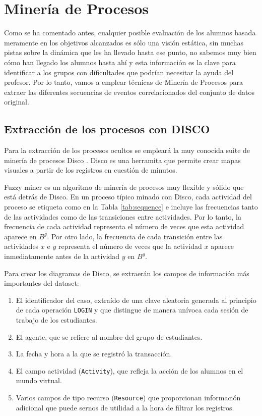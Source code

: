 \chapter{Minería de Procesos}

Como se ha comentado antes, cualquier posible evaluación de los alumnos basada meramente en los objetivos alcanzados es sólo una visión estática, sin muchas pistas sobre la dinámica que les ha llevado hasta ese punto, no sabemos muy bien cómo han llegado los alumnos hasta ahí y esta información es la clave para identificar a los grupos con dificultades que podrían necesitar la ayuda del profesor. Por lo tanto, vamos a emplear técnicas de Minería de Procesos \cite{aalst2016} para extraer las diferentes secuencias de eventos correlacionados del conjunto de datos original.

\section{Extracción de los procesos con DISCO}

Para la extracción de los procesos ocultos se empleará la muy conocida suite de minería de procesos Disco \cite{gunther2012disco}. Disco es una herramita que permite crear mapas visuales a partir de los registros en cuestión de minutos.

Fuzzy miner \cite{gunther2007fuzzy} es un algoritmo de minería de procesos muy flexible y sólido que está detrás de Disco. En un proceso típico minado con Disco, cada actividad del proceso se etiqueta como en la Tabla \ref{tab:sequence} e incluye las frecuencias tanto de las actividades como de las transiciones entre actividades. Por lo tanto, la frecuencia de cada actividad representa el número de veces que esta actividad aparece en $B^g$. Por otro lado, la frecuencia de cada transición entre las actividades $x$ e $y$ representa el número de veces que la actividad $x$ aparece inmediatamente antes de la actividad $y$ en $B^g$.

Para crear los diagramas de Disco, se extraerán los campos de información más importantes del dataset:
\begin{enumerate}
\item El identificador del caso, extraído de una clave aleatoria generada al principio de cada operación \texttt{LOGIN} y que distingue de manera unívoca cada sesión de trabajo de los estudiantes.
\item El agente, que se refiere al nombre del grupo de estudiantes.
\item La fecha y hora a la que se registró la transacción.
\item El campo actividad (\texttt{Activity}), que refleja la acción de los alumnos en el mundo virtual.
\item Varios campos de tipo recurso (\texttt{Resource}) que proporcionan información adicional que puede sernos de utilidad a la hora de filtrar los registros.
\end{enumerate}

